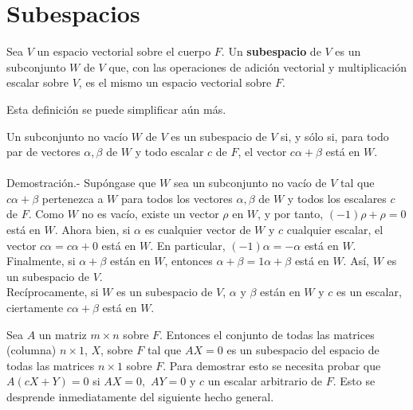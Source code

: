 \section{Subespacios}

\begin{def.}
    Sea $V$ un espacio vectorial sobre el cuerpo $F$. Un \textbf{subespacio} de $V$ es un subconjunto $W$ de $V$ que, con las operaciones de adición vectorial y multiplicación escalar sobre $V$, es el mismo un espacio vectorial sobre $F$.
\end{def.}

Esta definición se puede simplificar aún más.

\begin{teo}
    Un subconjunto no vacío $W$ de $V$ es un subespacio de $V$ si, y sólo si, para todo par de vectores $\alpha,\beta$ de $W$ y todo escalar $c$ de $F$, el vector $c\alpha+\beta$ está en $W$.\\\\
	Demostración.-\; Supóngase que $W$ sea un subconjunto no vacío de $V$ tal que $c\alpha+\beta$ pertenezca a $W$ para todos los vectores $\alpha,\beta$ de $W$ y todos los escalares $c$ de $F$. Como $W$ no es vacío, existe un vector $\rho$ en $W$, y por tanto, $(-1)\rho+\rho=0$ está en $W$. Ahora bien, si $\alpha$ es cualquier vector de $W$ y $c$ cualquier escalar, el vector $c\alpha=c\alpha+0$ está en $W$. En particular, $(-1)\alpha=-\alpha$ está en $W$. Finalmente, si $\alpha+\beta$ están en $W$, entonces $\alpha+\beta=1\alpha+\beta$ está en $W$. Así, $W$ es un subespacio de $V$.\\
	Recíprocamente, si $W$ es un subespacio de $V$, $\alpha$ y $\beta$ están en $W$ y $c$ es un escalar, ciertamente $c\alpha+\beta$ está en $W$.
\end{teo}

\setcounter{ejem}{6}
\begin{ejem}
Sea $A$ un matriz $m\times n$ sobre $F$. Entonces el conjunto de todas las matrices (columna) $n\times 1$, $X$, sobre $F$ tal que $AX=0$ es un subespacio del espacio de todas las matrices $n\times 1$ sobre $F$. Para demostrar esto se necesita probar que $A(cX+Y)=0$ si $AX=0,$ $AY=0$ y $c$ un escalar arbitrario  de $F$. Esto se desprende inmediatamente del siguiente hecho general.
\end{ejem}

